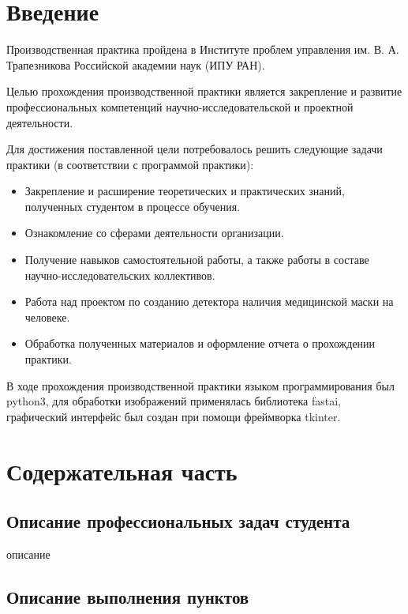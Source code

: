 \documentclass[a4paper,14pt]{article}
\begin{document}
% 
\tableofcontents
\pagebreak

\section{Введение}

Производственная практика пройдена в Институте проблем управления им. В. А. Трапезникова Российской академии наук (ИПУ РАН).

Целью прохождения производственной практики является закрепление и развитие профессиональных компетенций научно-исследовательской и проектной деятельности.

Для достижения поставленной цели потребовалось решить следующие задачи практики (в соответствии с программой практики):
\begin{itemize}
	\item Закрепление и расширение теоретических и практических знаний, полученных студентом в процессе обучения.

	\item Ознакомление со сферами деятельности организации.

	\item Получение навыков самостоятельной работы, а также работы в составе научно-исследовательских коллективов.

	\item Работа над проектом по созданию детектора наличия медицинской маски на человеке.

	\item Обработка полученных материалов и оформление отчета о прохождении практики.
\end{itemize}

В ходе прохождения производственной практики языком программирования был python3, для обработки изображений применялась библиотека fastai, графический интерфейс был создан при помощи фреймворка tkinter.

\pagebreak
\section{Содержательная часть}

\subsection{Описание профессиональных задач студента}

описание

\subsection{Описание выполнения пунктов}
\end{document}
